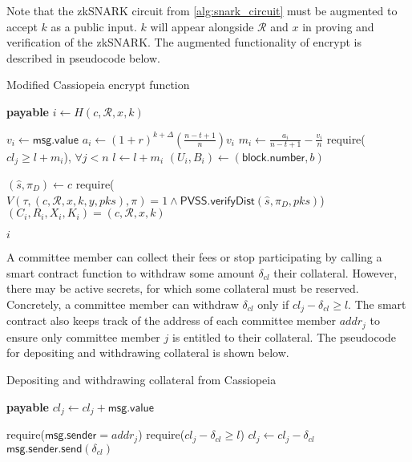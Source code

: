 Note that the zkSNARK circuit from \ref{alg:snark_circuit} must be augmented to accept $k$ as a public input.
$k$ will appear alongside $\mathcal{R}$ and $x$ in proving and verification of the zkSNARK.
The augmented functionality of \textsf{encrypt} is described in pseudocode below.

\begin{algorithm}[H]
\caption{Modified Cassiopeia \textsf{encrypt} function}
    \begin{algorithmic}[1]
             \textbf{payable}
                \State $i \gets H(c, \mathcal{R}, x, k)$

                \State $v_i \gets \textsf{msg.value}$
                \State $a_i \gets (1+r)^{k + \Delta}(\frac{n - t + 1}{n})v_i$
                \State $m_i \gets \frac{a_i}{n - t + 1} - \frac{v_i}{n}$
                \State require($cl_j \geq l + m_i$), $\forall j < n$
                \State $l \gets l + m_i$
                \State $(U_i, B_i) \gets (\textsf{block.number}, b)$

                \State $(\hat{s}, \pi_D) \gets c$
                \State require($V(\tau, (c, \mathcal{R}, x, k, y, pks), \pi) = 1 \land \textsf{PVSS.verifyDist}(\hat{s}, \pi_D, pks)$)
                \State $(C_i, R_i, X_i, K_i) = (c, \mathcal{R}, x, k)$

                \State \Return $i$
            \EndFunction
    \end{algorithmic}
\end{algorithm}

A committee member can collect their fees or stop participating by calling a smart contract function to withdraw some amount $\delta_{cl}$ their collateral.
However, there may be active secrets, for which some collateral must be reserved.
Concretely, a committee member can withdraw $\delta_{cl}$ only if $cl_j - \delta_{cl} \geq l$.
The smart contract also keeps track of the address of each committee member $addr_j$ to ensure only committee member $j$ is entitled to their collateral.
The pseudocode for depositing and withdrawing collateral is shown below.

\begin{algorithm}[H]
\caption{Depositing and withdrawing collateral from Cassiopeia}
    \begin{algorithmic}[1]
         \textbf{payable}
            \State $cl_j \gets cl_j + \textsf{msg.value}$
        \EndFunction

            \State require($\textsf{msg.sender} = addr_j$)
            \State require($cl_j - \delta_{cl} \geq l$)
            \State $cl_j \gets cl_j - \delta_{cl}$
            \State $\textsf{msg.sender.send}(\delta_{cl})$
        \EndFunction
    \end{algorithmic}
\end{algorithm}

